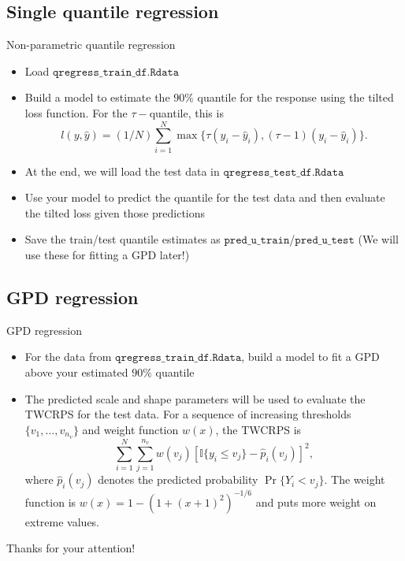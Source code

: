 \documentclass{beamer}
\begin{document}
\subsection{Single quantile regression}
\begin{frame}{Non-parametric quantile regression}
\begin{itemize}
\item Load $\texttt{qregress\_train\_df.Rdata}$
\item Build a model to estimate the $90\%$ quantile for the response using the tilted loss function. For the $\tau-$quantile, this is \[
l(y,\hat{y})=(1/N)\sum^{N}_{i=1}\max\{\tau(y_i-\hat{y}_i),(\tau-1)(y_i-\hat{y}_i)\}.
\]
\item At the end, we will load the test data in  $\texttt{qregress\_test\_df.Rdata}$
\item Use your model to predict the quantile for the test data and then evaluate the tilted loss given those predictions
\item Save the train/test quantile estimates as $\texttt{pred\_u\_train}$/$\texttt{pred\_u\_test}$ (We will use these for fitting a GPD later!)
\end{itemize}
\end{frame}
\subsection{GPD regression}
\begin{frame}{GPD regression}
\begin{itemize}
\item For the data from $\texttt{qregress\_train\_df.Rdata}$, build a model to fit a GPD above your estimated $90\%$ quantile
\item The predicted scale and shape parameters will be used to evaluate the TWCRPS for the test data. For a sequence of increasing thresholds $\{v_1,\dots,v_{n_v}\}$ and weight function $w(x)$, the TWCRPS is 
\[
\sum_{i=1}^N\sum^{n_v}_{j=1}w(v_j)[\mathbb{I}\{y_i\leq v_j\}-\hat{p}_i(v_j)]^2,
\]
where $\hat{p}_i(v_j)$ denotes the predicted probability $\Pr\{Y_i < v_j\}$. The weight function is $w(x)=1-(1+(x+1)^2)^{-1/6}$ and puts more weight on extreme values.
\end{itemize}
\end{frame}
\begin{frame}
\begin{center}
\Huge Thanks for your attention!
\end{center}
\end{frame}
\end{document}
